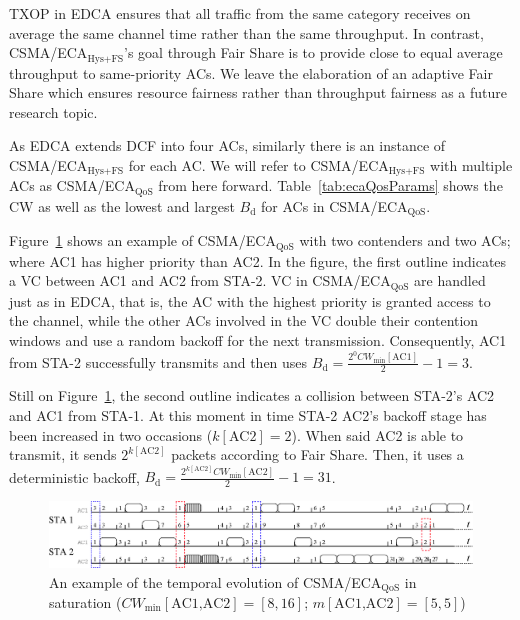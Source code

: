 TXOP in EDCA ensures that all traffic from the same category receives on average the same channel time rather than the same throughput. In contrast, CSMA/ECA$_{\text{Hys+FS}}$'s goal through Fair Share is to provide close to equal average throughput to same-priority ACs. We leave the elaboration of an adaptive Fair Share which ensures resource fairness rather than throughput fairness as a future research topic.

As EDCA extends DCF into four ACs, similarly there is an instance of CSMA/ECA$_{\text{Hys+FS}}$ for each AC. We will refer to CSMA/ECA$_{\text{Hys+FS}}$ with multiple ACs as CSMA/ECA$_{\text{QoS}}$ from here forward. Table~\ref{tab:ecaQosParams} shows the CW as well as the lowest and largest $B_{\text{d}}$ for ACs in CSMA/ECA$_{\text{QoS}}$.

Figure~\ref{fig:ecaQoS} shows an example of CSMA/ECA$_{\text{QoS}}$ with two contenders and two ACs; where AC1 has higher priority than AC2. In the figure, the first outline indicates a VC between AC1 and AC2 from STA-2. VC in CSMA/ECA$_{\text{QoS}}$ are handled just as in EDCA, that is, the AC with the highest priority is granted access to the channel, while the other ACs involved in the VC double their contention windows and use a random backoff for the next transmission. Consequently, AC1 from STA-2 successfully transmits and then uses $B_{\text{d}}=\frac{2^{0}CW_{\min}[\text{AC1}]}{2}-1= 3$.

Still on Figure~\ref{fig:ecaQoS}, the second outline indicates a collision between STA-2's AC2 and AC1 from STA-1. At this moment in time STA-2 AC2's backoff stage has been increased in two occasions ($k[\text{AC2}]=2$). When said AC2 is able to transmit, it sends $2^{k[\text{AC2}]}$ packets according to Fair Share. Then, it uses a deterministic backoff, $B_{\text{d}}=\frac{2^{k[\text{AC2}]}CW_{\min}[\text{AC2}]}{2}-1=31$.

	\begin{figure}[tb]
	\centering
		\includegraphics[width=0.9\linewidth]{figures/csma-eca-hew-oldScheme-fixed.eps}
		\caption{An example of the temporal evolution of CSMA/ECA$_{\text{QoS}}$ in saturation ($CW_{\min}[\text{AC1,AC2}]=[8,16]$; $m[\text{AC1,AC2}]=[5,5]$)}
		\label{fig:ecaQoS}
	\end{figure}

